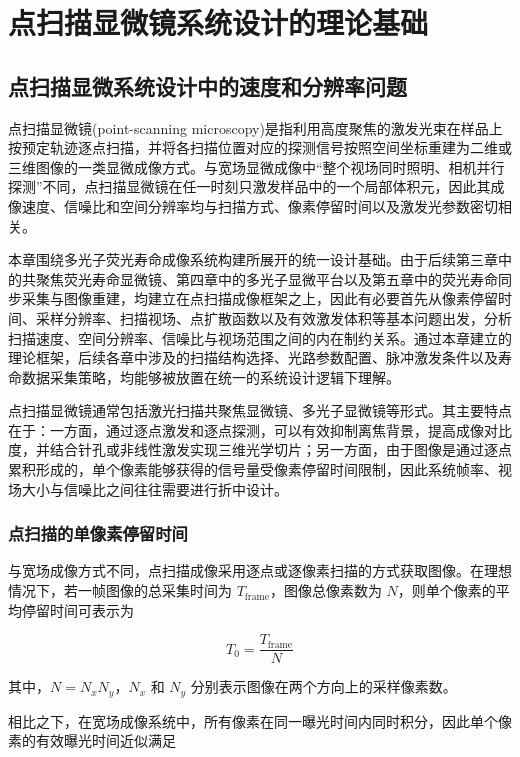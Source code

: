 \chapter{点扫描显微镜系统设计的理论基础}\label{chap:2}
\section{点扫描显微系统设计中的速度和分辨率问题}\label{2.1}
点扫描显微镜(point-scanning microscopy)是指利用高度聚焦的激发光束在样品上按预定轨迹逐点扫描，并将各扫描位置对应的探测信号按照空间坐标重建为二维或三维图像的一类显微成像方式。与宽场显微成像中``整个视场同时照明、相机并行探测''不同，点扫描显微镜在任一时刻只激发样品中的一个局部体积元，因此其成像速度、信噪比和空间分辨率均与扫描方式、像素停留时间以及激发光参数密切相关。

本章围绕多光子荧光寿命成像系统构建所展开的统一设计基础。由于后续第三章中的共聚焦荧光寿命显微镜、第四章中的多光子显微平台以及第五章中的荧光寿命同步采集与图像重建，均建立在点扫描成像框架之上，因此有必要首先从像素停留时间、采样分辨率、扫描视场、点扩散函数以及有效激发体积等基本问题出发，分析扫描速度、空间分辨率、信噪比与视场范围之间的内在制约关系。通过本章建立的理论框架，后续各章中涉及的扫描结构选择、光路参数配置、脉冲激发条件以及寿命数据采集策略，均能够被放置在统一的系统设计逻辑下理解。

点扫描显微镜通常包括激光扫描共聚焦显微镜、多光子显微镜等形式。其主要特点在于：一方面，通过逐点激发和逐点探测，可以有效抑制离焦背景，提高成像对比度，并结合针孔或非线性激发实现三维光学切片；另一方面，由于图像是通过逐点累积形成的，单个像素能够获得的信号量受像素停留时间限制，因此系统帧率、视场大小与信噪比之间往往需要进行折中设计。

\subsection{点扫描的单像素停留时间}\label{2.1.1}
与宽场成像方式不同，点扫描成像采用逐点或逐像素扫描的方式获取图像。在理想情况下，若一帧图像的总采集时间为 $T_{\mathrm{frame}}$，图像总像素数为 $N$，则单个像素的平均停留时间可表示为

\begin{equation}
T_0=\frac{T_{\mathrm{frame}}}{N}
\label{eq:dwell_time_basic}
\end{equation}

其中，$N=N_xN_y$，$N_x$ 和 $N_y$ 分别表示图像在两个方向上的采样像素数。

相比之下，在宽场成像系统中，所有像素在同一曝光时间内同时积分，因此单个像素的有效曝光时间近似满足

